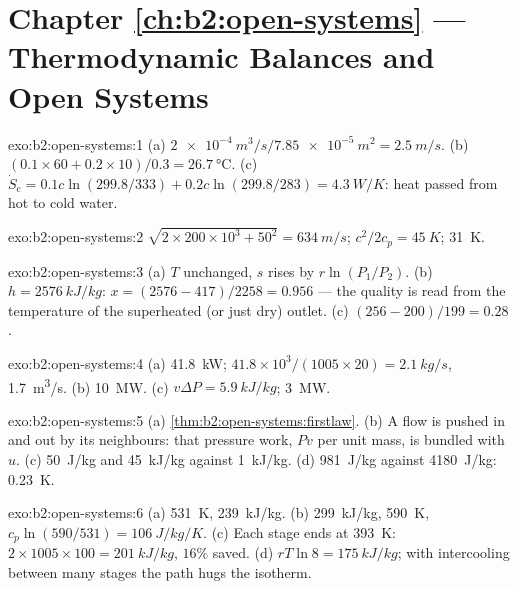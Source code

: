 \section*{Chapter \ref{ch:b2:open-systems} --- Thermodynamic Balances and Open Systems}

\begin{solution}{exo:b2:open-systems:1}
(a) $\qty{2e-4}{m^3/s}/\qty{7.85e-5}{m^2} = \qty{2.5}{m/s}$. (b) $(0.1 \times 60 + 0.2
\times 10)/0.3 = \qty{26.7}{\celsius}$. (c) $\dot S_{\text{c}} = 0.1c\ln(299.8/333) +
0.2c\ln(299.8/283) = \qty{4.3}{W/K}$: heat passed from hot to cold water.
\end{solution}

\begin{solution}{exo:b2:open-systems:2}
$\sqrt{2 \times 200 \times 10^3 + 50^2} = \qty{634}{m/s}$; $c^2/2c_p = \qty{45}{K}$;
\qty{31}{K}.
\end{solution}

\begin{solution}{exo:b2:open-systems:3}
(a) $T$ unchanged, $s$ rises by $r\ln(P_1/P_2)$. (b) $h = \qty{2576}{kJ/kg}$:
$x = (2576 - 417)/2258 = 0.956$ --- the quality is read from the
temperature of the superheated (or just dry) outlet. (c) $(256 -
200)/199 = 0.28$.
\end{solution}

\begin{solution}{exo:b2:open-systems:4}
(a) \qty{41.8}{kW}; $41.8 \times 10^3/(1005 \times 20) = \qty{2.1}{kg/s}$, \qty{1.7}{m^3/s}.
(b) \qty{10}{MW}. (c) $v\Delta P = \qty{5.9}{kJ/kg}$; \qty{3}{MW}.
\end{solution}

\begin{solution}{exo:b2:open-systems:5}
(a) \cref{thm:b2:open-systems:firstlaw}. (b) A flow is pushed in and
out by its neighbours: that pressure work, $Pv$ per unit mass, is
bundled with $u$. (c) \qty{50}{J/kg} and \qty{45}{kJ/kg} against \qty{1}{kJ/kg}.
(d) \qty{981}{J/kg} against \qty{4180}{J/kg}: \qty{0.23}{K}.
\end{solution}

\begin{solution}{exo:b2:open-systems:6}
(a) \qty{531}{K}, \qty{239}{kJ/kg}. (b) \qty{299}{kJ/kg}, \qty{590}{K}, $c_p\ln(590/531)
= \qty{106}{J/kg/K}$. (c) Each stage ends at \qty{393}{K}: $2 \times 1005 \times 100 =
\qty{201}{kJ/kg}$, $16\%$ saved. (d) $rT\ln 8 = \qty{175}{kJ/kg}$; with
intercooling between many stages the path hugs the isotherm.
\end{solution}

